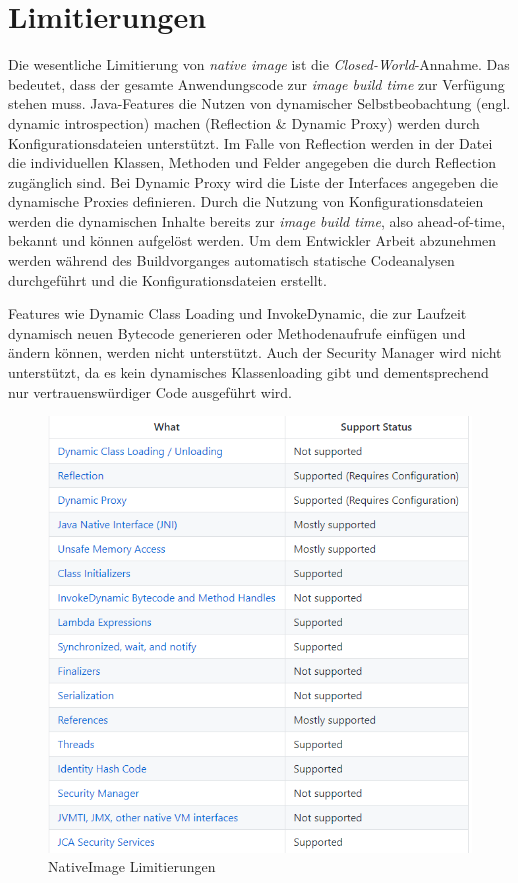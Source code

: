 \section{Limitierungen}
\label{sec:limitierungen}

Die wesentliche Limitierung von \textit{native image} ist die \textit{Closed-World}-Annahme. Das bedeutet, dass der gesamte Anwendungscode zur \textit{image build time} zur Verfügung
stehen muss. Java-Features die Nutzen von dynamischer Selbstbeobachtung (engl. dynamic introspection) machen (Reflection & Dynamic Proxy) werden durch Konfigurationsdateien unterstützt.
Im Falle von Reflection werden in der Datei die individuellen Klassen, Methoden  und Felder angegeben die durch Reflection zugänglich sind. Bei Dynamic Proxy wird die Liste der Interfaces
angegeben die dynamische Proxies definieren. Durch die Nutzung von Konfigurationsdateien werden die dynamischen Inhalte bereits zur \textit{image build time}, also ahead-of-time, bekannt und
können aufgelöst werden. Um dem Entwickler Arbeit abzunehmen werden während des Buildvorganges automatisch statische Codeanalysen durchgeführt und die Konfigurationsdateien erstellt.

Features wie Dynamic Class Loading und InvokeDynamic, die zur Laufzeit dynamisch neuen Bytecode generieren oder Methodenaufrufe einfügen und ändern können, werden nicht unterstützt.
Auch der Security Manager wird nicht unterstützt, da es kein dynamisches Klassenloading gibt und dementsprechend nur vertrauenswürdiger Code ausgeführt wird. 


\begin{figure}[h]
	\centering
	\includegraphics[width=1\textwidth]{resources/limitations.png}
	\caption{NativeImage Limitierungen \cite{GraalLimitiations}}
	\label{fig:system_limitations}
\end{figure}
